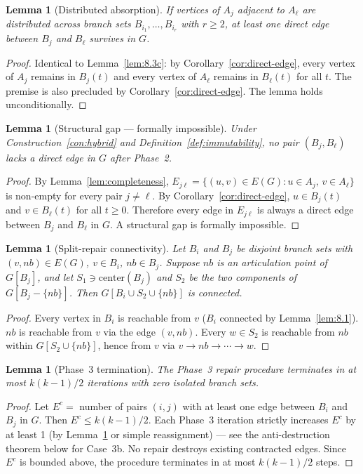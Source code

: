 \documentclass[12pt,a4paper]{article}
\newtheorem{lemma}[theorem]{Lemma}
\theoremstyle{definition}
\begin{document}
\begin{lemma}[Distributed absorption]
\label{lem:8.3d}
If vertices of $A_j$ adjacent to $A_\ell$ are distributed across branch
sets $B_{i_1}, \ldots, B_{i_r}$ with $r \geq 2$, at least one direct
edge between $B_j$ and $B_\ell$ survives in $G$.
\end{lemma}
\begin{proof}
Identical to Lemma~\ref{lem:8.3c}: by Corollary~\ref{cor:direct-edge},
every vertex of $A_j$ remains in $B_j(t)$ and every vertex of $A_\ell$
remains in $B_\ell(t)$ for all $t$. The premise is also precluded by
Corollary~\ref{cor:direct-edge}. The lemma holds unconditionally.
\end{proof}

\begin{lemma}[Structural gap --- formally impossible]
\label{lem:8.3e}
Under Construction~\ref{con:hybrid} and Definition~\ref{def:immutability},
no pair $(B_j, B_\ell)$ lacks a direct edge in $G$ after Phase~2.
\end{lemma}
\begin{proof}
By Lemma~\ref{lem:completeness}, $E_{j\ell} = \{(u,v) \in E(G) : u \in
A_j,\, v \in A_\ell\}$ is non-empty for every pair $j \neq \ell$.
By Corollary~\ref{cor:direct-edge}, $u \in B_j(t)$ and $v \in B_\ell(t)$
for all $t \geq 0$. Therefore every edge in $E_{j\ell}$ is always a
direct edge between $B_j$ and $B_\ell$ in $G$. A structural gap is
formally impossible.
\end{proof}

\begin{lemma}[Split-repair connectivity]
\label{lem:8.3fA}
Let $B_i$ and $B_j$ be disjoint branch sets with $(v, nb) \in E(G)$,
$v \in B_i$, $nb \in B_j$. Suppose $nb$ is an articulation point of
$G[B_j]$, and let $S_1 \ni \mathrm{center}(B_j)$ and $S_2$ be the two
components of $G[B_j - \{nb\}]$. Then $G[B_i \cup S_2 \cup \{nb\}]$ is
connected.
\end{lemma}
\begin{proof}
Every vertex in $B_i$ is reachable from $v$ ($B_i$ connected by
Lemma~\ref{lem:8.1}). $nb$ is reachable from $v$ via the edge $(v, nb)$.
Every $w \in S_2$ is reachable from $nb$ within $G[S_2 \cup \{nb\}]$,
hence from $v$ via $v \to nb \to \cdots \to w$.
\end{proof}

\begin{lemma}[Phase~3 termination]
\label{lem:8.3fB}
The Phase~3 repair procedure terminates in at most $k(k-1)/2$ iterations
with zero isolated branch sets.
\end{lemma}
\begin{proof}
Let $E^c = $ number of pairs $(i,j)$ with at least one edge between
$B_i$ and $B_j$ in $G$. Then $E^c \leq k(k-1)/2$. Each Phase~3
iteration strictly increases $E^c$ by at least 1 (by
Lemma~\ref{lem:8.3fA} or simple reassignment) --- see the anti-destruction
theorem below for Case~3b. No repair destroys existing contracted edges.
Since $E^c$ is bounded above, the procedure terminates in at most
$k(k-1)/2$ steps.
\end{proof}
\end{document}
